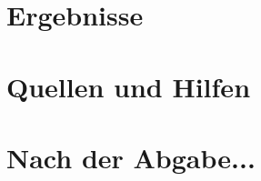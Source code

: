 \documentclass[a4paper,10pt]{scrartcl}
\begin{document}
\section{Ergebnisse} \label{ergebnisse}
% 

\newpage

\section{Quellen und Hilfen} \label{quellen}
% 

\newpage

\section{Nach der Abgabe...} \label{nach_der_abgabe}
% 

\end{document}
